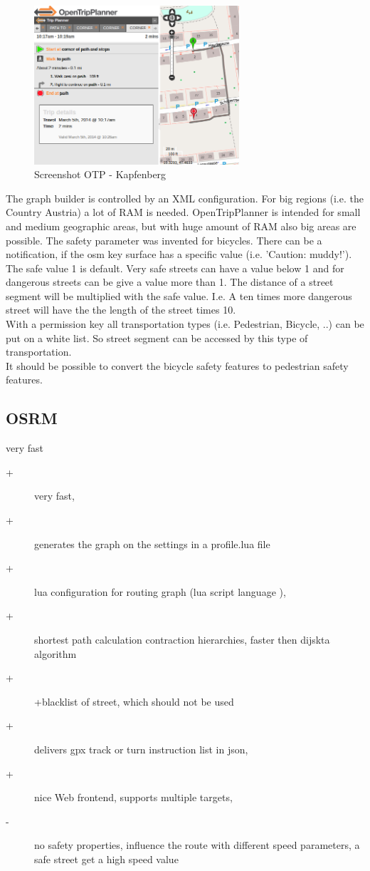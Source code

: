 \documentclass{sig-alternate}
\begin{document}
\begin{figure}
\centering
\includegraphics[width=3in]{otp-ss.png}
\caption{Screenshot OTP - Kapfenberg}
\end{figure}
 
 The graph builder is controlled by an XML configuration. For big regions (i.e. the Country Austria) a lot of RAM is needed. OpenTripPlanner is intended for small and medium geographic areas, but with huge amount of RAM also big areas are possible. The safety parameter was invented for bicycles. There can be a notification, if the osm key surface  has a specific value (i.e. 'Caution: muddy!'). The safe value 1 is default. Very safe streets can have a value below 1 and for dangerous streets can be give a value more than 1. The distance of a street segment will be multiplied with the safe value. I.e. A ten times more dangerous street will have the the length of the street times 10. \\
 With a permission key all transportation types (i.e. Pedestrian, Bicycle, ..) can be put on a white list. So street segment can be accessed by this type of transportation. \\
 It should be possible to convert the bicycle safety features to pedestrian safety features.
 



\subsection{OSRM}
very fast\cite{luxen-vetter-2011}
\begin{description}
\item[+]very fast, 
\item[+]generates the graph on the settings in a profile.lua file
\item[+]lua configuration for routing graph (lua script language ), 
\item[+]shortest path calculation contraction hierarchies, faster then dijskta algorithm
\item[+]+blacklist of street, which should not be used
\item[+]delivers gpx track or turn instruction list in json,
\item[+]nice Web frontend, supports multiple targets,
\item[-] no safety properties, influence the route with different speed parameters, a safe street get a high speed value
\end{description}
\end{document}
